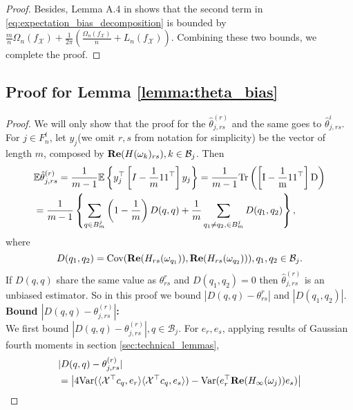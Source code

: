 \begin{proof}
Besides, Lemma A.4 in \cite{sun2018large} shows that the second term in \eqref{eq:expectation_bias_decomposition} is bounded by $\frac{m}{n}\Omega_n(f_\mathcal{X}) + \frac{1}{2\pi}\left(\frac{\Omega_n(f_\mathcal{X})}{n}+L_n(f_\mathcal{X})\right)$. Combining these two bounds, we complete the proof. 
 \end{proof}
 
\subsection{Proof for Lemma \ref{lemma:theta_bias}} 
\begin{proof}
We will only show that the proof for the $\hat{\theta}^{(r)}_{j,rs}$ and the same goes to
$\hat{\theta}^{i}_{j,rs}$.
For $j\in F_n^{t}$, let $y_j$(we omit $r,s$ from notation for simplicity) be the vector of length $m$, composed by  ${\bf Re}(H(\omega_k)_{rs}), k\in \mathcal{B}_j$. Then 
\begin{equation}
\begin{aligned}
&\mathbb{E} \hat{\theta}^{(r)}_{j,rs} = \frac{1}{m-1}\mathbb{E}\left\{y_j^\top   \left[I-\frac{1}{m}11^\top   \right]y_j\right\} = \frac{1}{m-1}\rm{Tr}\left(\left[I-\frac{1}{m}11^\top   \right] D\right) \\
&= \frac{1}{m-1}\left\{\sum_{q\in B^j_m} \left(1-\frac{1}{m}\right)D(q,q) + \frac{1}{m} \sum_{q_1\neq q_2, \in B^j_m}D(q_1,q_2)\right\}, 
\end{aligned}
\end{equation}
where 
\begin{equation}
D(q_1,q_2) = \mbox{Cov}({\bf Re}(H_{rs}(\omega_{q_1})), {\bf Re}(H_{rs}(\omega_{q_2}))), q_1,q_2 \in \mathcal{B}_j.
\end{equation}
If $D(q,q)$ share the same value as $\theta^r_{rs}$ and $D(q_1,q_2)=0$ then $\hat{\theta}^{(r)}_{j,rs}$ is an unbiased estimator. So in this proof we bound  
$|D(q,q) - \theta^r_{rs}|$ and $|D(q_1,q_2)|$.\\[0.2cm]
{\bf Bound $|D(q,q) - \theta^{(r)}_{j, rs}|$:}\\
We first bound  $|D(q,q)-\theta^{(r)}_{j, rs}|, q\in \mathcal{B}_j$. 
For $e_r, e_s$, applying results of Gaussian fourth moments in section \ref{sec:technical_lemmas}, 
\begin{equation}
\label{eq: dif_liminting_var}
\begin{aligned}
&|D(q,q)-\theta^{(r)}_{j, rs}| \\
&=  \left|4\var(\langle \mathcal{X}^\top   c_q,e_r\rangle \langle \mathcal{\mathcal{X}}^\top   c_q,e_s\rangle) - \var(e_r^\top  {\bf Re}(H_{\infty}(\omega_j))e_s)\right| \\

\end{aligned}
\end{equation}
\end{proof}

